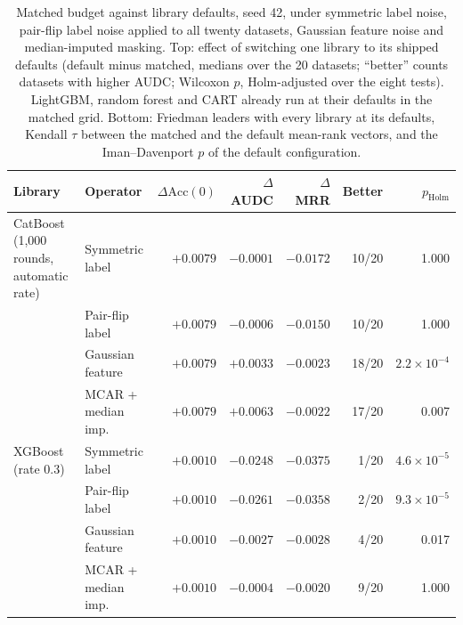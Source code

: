 \documentclass[pdflatex,sn-mathphys]{sn-jnl}
\theoremstyle{thmstyleone}
\begin{document}
\begin{table}[t]
\centering
\footnotesize
\setlength{\tabcolsep}{2.5pt}
\caption{Matched budget against library defaults, seed 42, under symmetric label noise, pair-flip label noise applied to all twenty datasets, Gaussian feature noise and median-imputed masking. Top: effect of switching one library to its shipped defaults (default minus matched, medians over the 20 datasets; ``better'' counts datasets with higher AUDC; Wilcoxon $p$, Holm-adjusted over the eight tests). LightGBM, random forest and CART already run at their defaults in the matched grid. Bottom: Friedman leaders with every library at its defaults, Kendall $\tau$ between the matched and the default mean-rank vectors, and the Iman--Davenport $p$ of the default configuration.}
\label{tab:budget}
\begin{tabular}{@{}llrrrrr@{}}
\toprule
Library & Operator & $\Delta\mathrm{Acc}(0)$ & $\Delta$AUDC & $\Delta$MRR & Better & $p_{\mathrm{Holm}}$ \\
\midrule
CatBoost (1{,}000 rounds, automatic rate) & Symmetric label & $+0.0079$ & $-0.0001$ & $-0.0172$ & 10/20 & 1.000 \\
 & Pair-flip label & $+0.0079$ & $-0.0006$ & $-0.0150$ & 10/20 & 1.000 \\
 & Gaussian feature & $+0.0079$ & $+0.0033$ & $-0.0023$ & 18/20 & $2.2\times10^{-4}$ \\
 & MCAR + median imp. & $+0.0079$ & $+0.0063$ & $-0.0022$ & 17/20 & 0.007 \\
\midrule
XGBoost (rate 0.3) & Symmetric label & $+0.0010$ & $-0.0248$ & $-0.0375$ & 1/20 & $4.6\times10^{-5}$ \\
 & Pair-flip label & $+0.0010$ & $-0.0261$ & $-0.0358$ & 2/20 & $9.3\times10^{-5}$ \\
 & Gaussian feature & $+0.0010$ & $-0.0027$ & $-0.0028$ & 4/20 & 0.017 \\
 & MCAR + median imp. & $+0.0010$ & $-0.0004$ & $-0.0020$ & 9/20 & 1.000 \\
\bottomrule
\end{tabular}


\end{table}
\end{document}
